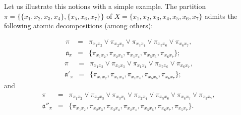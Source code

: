 \documentclass[12pt]{extarticle}
\begin{document}
	Let us illustrate this notions with a simple example. The partition $\pi=\{\{x_1,x_2,x_3,x_4\},\{x_5,x_6,x_7\}\}$ of $X=\{x_1,x_2,x_3,x_4,x_5,x_6,x_7\}$ admits the following atomic decompositions (among others):
	
	\begin{eqnarray}\label{decomp1}
	\pi&=& \pi_{x_1x_2}\vee \pi_{x_2x_3}\vee \pi_{x_3x_4}\vee \pi_{x_5x_6}\vee \pi_{x_6x_7},\nonumber\\
	\mathfrak{a}_{\pi} &=& \{\pi_{x_1x_2}, \pi_{x_2x_3}, \pi_{x_3x_4}, \pi_{x_5x_6}, \pi_{x_6x_7}\};
	\end{eqnarray}
		\begin{eqnarray}\label{decomp2}
	\pi&= &\pi_{x_1x_2}\vee \pi_{x_1x_3}\vee \pi_{x_1x_4}\vee \pi_{x_5x_6}\vee \pi_{x_6x_7},\nonumber\\
	\mathfrak{a}'_{\pi} &= &\{\pi_{x_1x_2}, \pi_{x_1x_3}, \pi_{x_1x_4}, \pi_{x_5x_6}, \pi_{x_6x_7}\};
	\end{eqnarray}
	and
	\begin{eqnarray}\label{decomp3}
	\pi&=& \pi_{x_1x_2}\vee \pi_{x_2x_3}\vee \pi_{x_3x_4}\vee \pi_{x_2x_4}\vee \pi_{x_5x_6}\vee \pi_{x_6x_7}\vee \pi_{x_5x_7},\nonumber\\
	\mathfrak{a}''_{\pi} &=& \{\pi_{x_1x_2}, \pi_{x_2x_3}, \pi_{x_3x_4},
	\pi_{x_2x_4},
	\pi_{x_5x_6}, \pi_{x_6x_7},
	\pi_{x_5x_7}\}.
	\end{eqnarray}
	
\end{document}

